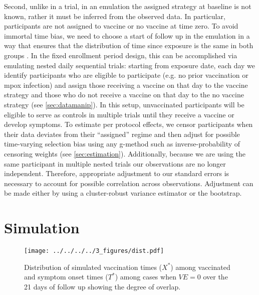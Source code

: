 \documentclass[11pt]{article}
\begin{document}
Second, unlike in a trial, in an emulation the assigned strategy at baseline is not known, rather it must be inferred from the observed data. In particular, participants are not assigned to vaccine or no vaccine at time zero. To avoid immortal time bias, we need to choose a start of follow up in the emulation in a way that ensures that the distribution of time since exposure is the same in both groups \cite{hernan2016specifying}. In the fixed enrollment period design, this can be accomplished via emulating nested daily sequential trials: starting from exposure date, each day we identify participants who are eligible to participate (e.g. no prior vaccination or mpox infection) and assign those receiving a vaccine on that day to the vaccine strategy and those who do not receive a vaccine on that day to the no vaccine strategy (see \ref{sec:datamanip}). In this setup, unvaccinated participants will be eligible to serve as controls in multiple trials until they receive a vaccine or develop symptoms. To estimate per protocol effects, we censor participants when their data deviates from their ``assigned'' regime and then adjust for possible time-varying selection bias using any g-method such as inverse-probability of censoring weights (see \ref{sec:estimation}). Additionally, because we are using the same participant in multiple nested trials our observations are no longer independent. Therefore, appropriate adjustment to our standard errors is necessary to account for possible correlation across observations. Adjustment can be made either by using a cluster-robust variance estimator or the bootstrap.  

\section{Simulation}\label{sec:simulation}
\begin{figure}[t]
  \centering
  \texttt{[image: ../../../../3\_figures/dist.pdf]}
  \caption{Distribution of simulated vaccination times ($X^*$) among vaccinated and symptom onset times ($T^*$) among cases when $VE = 0$ over the 21 days of follow up showing the degree of overlap.}
  \label{fig:example_overlap}
\end{figure}
\end{document}
